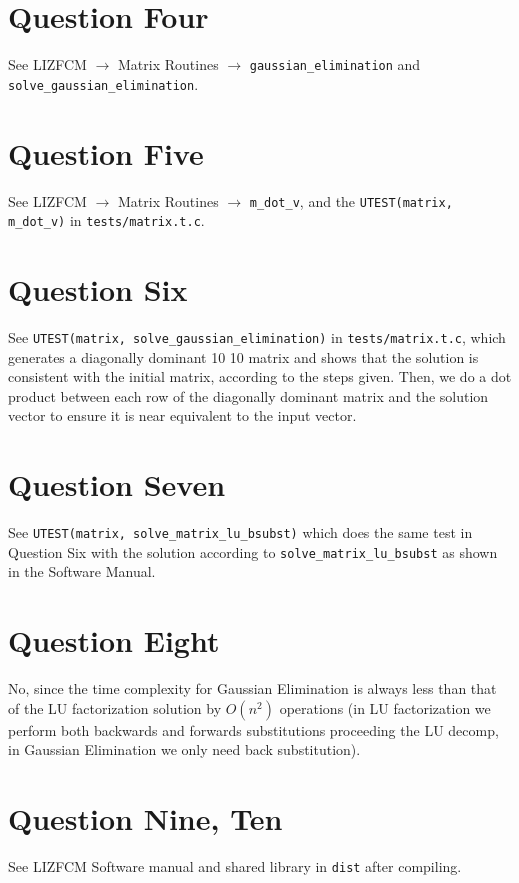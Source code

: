 \documentclass[11pt]{article}
\begin{document}
\section{Question Four}
\label{sec:org79d9061}

See LIZFCM \(\rightarrow\) Matrix Routines \(\rightarrow\) \texttt{gaussian\_elimination} and \texttt{solve\_gaussian\_elimination}.

\section{Question Five}
\label{sec:orgc6ac464}
See LIZFCM \(\rightarrow\) Matrix Routines \(\rightarrow\) \texttt{m\_dot\_v}, and the \texttt{UTEST(matrix, m\_dot\_v)} in
\texttt{tests/matrix.t.c}.

\section{Question Six}
\label{sec:org66fedab}
See \texttt{UTEST(matrix, solve\_gaussian\_elimination)} in \texttt{tests/matrix.t.c}, which generates a diagonally dominant 10 \texttimes{} 10 matrix
and shows that the solution is consistent with the initial matrix, according to the steps given. Then,
we do a dot product between each row of the diagonally dominant matrix and the solution vector to ensure
it is near equivalent to the input vector.

\section{Question Seven}
\label{sec:org6897ff2}
See \texttt{UTEST(matrix, solve\_matrix\_lu\_bsubst)} which does the same test in Question Six with the solution according to
\texttt{solve\_matrix\_lu\_bsubst} as shown in the Software Manual.

\section{Question Eight}
\label{sec:org5d529dd}
No, since the time complexity for Gaussian Elimination is always less than that of the LU factorization solution by \(O(n^2)\) operations
(in LU factorization we perform both backwards and forwards substitutions proceeding the LU decomp, in Gaussian Elimination we only need
back substitution).

\section{Question Nine, Ten}
\label{sec:org0fb8e09}
See LIZFCM Software manual and shared library in \texttt{dist} after compiling.
\end{document}
